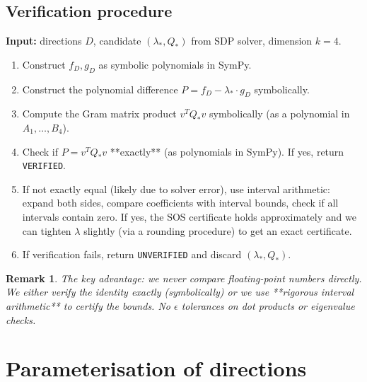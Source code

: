 \documentclass[12pt,a4paper]{article}
\newtheorem{remark}{Remark}
\begin{document}
\subsection*{Verification procedure}

\begin{algorithm}
\textbf{Input:} directions $D$, candidate $(\lambda_*, Q_*)$ from SDP solver, dimension $k=4$.

\begin{enumerate}
  \item Construct $f_D, g_D$ as symbolic polynomials in SymPy.

  \item Construct the polynomial difference $P = f_D - \lambda_* \cdot g_D$ symbolically.

  \item Compute the Gram matrix product $v^T Q_* v$ symbolically (as a polynomial in
    $A_1, \ldots, B_4$).

  \item Check if $P = v^T Q_* v$ **exactly** (as polynomials in SymPy).  If yes, return
    \texttt{VERIFIED}.

  \item If not exactly equal (likely due to solver error), use interval arithmetic:
    expand both sides, compare coefficients with interval bounds, check if all intervals
    contain zero. If yes, the SOS certificate holds approximately and we can tighten
    $\lambda$ slightly (via a rounding procedure) to get an exact certificate.

  \item If verification fails, return \texttt{UNVERIFIED} and discard $(\lambda_*, Q_*)$.
\end{enumerate}
\end{algorithm}

\begin{remark}
  The key advantage: we never compare floating-point numbers directly. We either verify
  the identity exactly (symbolically) or we use **rigorous interval arithmetic** to
  certify the bounds. No $\epsilon$ tolerances on dot products or eigenvalue checks.
\end{remark}

\section{Parameterisation of directions}
\label{sec:parameterization}
\end{document}
